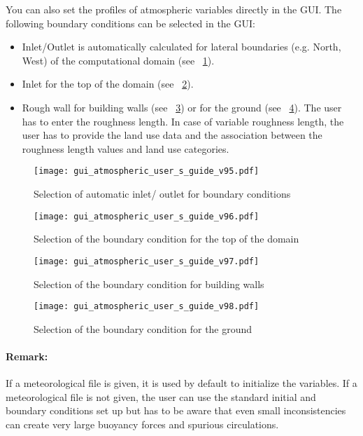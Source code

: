 {{You can also set the profiles of atmospheric variables directly in the GUI.
The following boundary conditions can be selected in the GUI:
%
\begin{itemize}
\item Inlet/Outlet is automatically calculated for lateral boundaries
(e.g. North, West\textellipsis ) of the computational domain
(see \figurename~\ref{fig:inlet}).
\item Inlet for the top of the domain (see \figurename~\ref{fig:top}).
\item Rough wall for building walls (see \figurename~\ref{fig:walls}) or for
the ground (see \figurename~\ref{fig:ground}).
The user has to enter the roughness length. In case of variable roughness
length, the user has to provide the land use data and the association
between the roughness length values and land use categories.
\end{itemize}
%
\begin{figure}[htbp]
\centerline{\texttt{[image: gui\_atmospheric\_user\_s\_guide\_v95.pdf]}}
\caption{Selection of automatic inlet/ outlet for boundary conditions }
\label{fig:inlet}
\end{figure}
%
\begin{figure}[htbp]
\centerline{\texttt{[image: gui\_atmospheric\_user\_s\_guide\_v96.pdf]}}
\caption{Selection of the boundary condition for the top of the domain }
\label{fig:top}
\end{figure}
%
\begin{figure}[htbp]
\centerline{\texttt{[image: gui\_atmospheric\_user\_s\_guide\_v97.pdf]}}
\caption{Selection of the boundary condition for building walls}
\label{fig:walls}
\end{figure}
%
\begin{figure}[htbp]
\centerline{\texttt{[image: gui\_atmospheric\_user\_s\_guide\_v98.pdf]}}
\caption{Selection of the boundary condition for the ground}
\label{fig:ground}
\end{figure}

\paragraph{Remark:} If a meteorological file is given, it is used by default to
initialize the variables. If a meteorological file is not given, the user can
use the standard \CS initial and boundary conditions set up but has to be aware
that even small inconsistencies can create very large buoyancy forces and
spurious circulations.

}}
